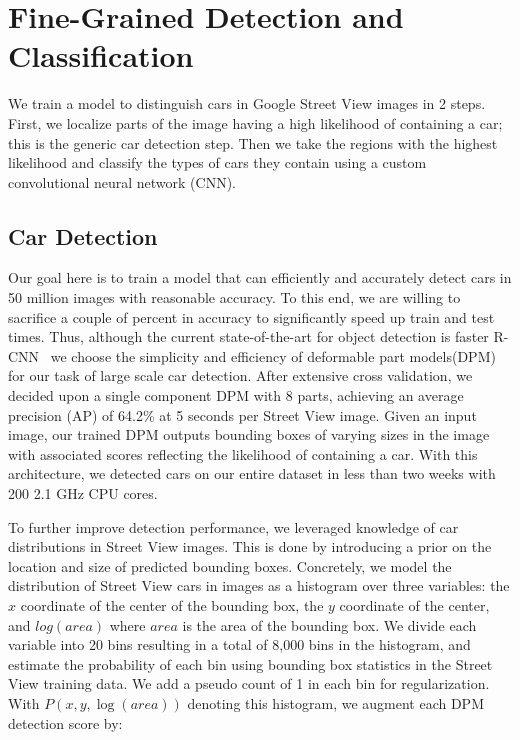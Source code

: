 \documentclass[letterpaper]{article}
\begin{document}
\section{Fine-Grained Detection and Classification}
\label{sec:detection}
We train a model to distinguish cars in Google Street View images in 2 steps. First, we localize parts of the image having a high likelihood of containing a car; this is the generic car detection step. Then we take the regions with the highest likelihood and classify the types of cars they contain using a custom convolutional neural network (CNN).

\subsection{Car Detection}
Our goal here is to train a model that can efficiently and accurately detect cars in 50 million images with reasonable accuracy. To this end, we are willing to sacrifice a couple of percent in accuracy to significantly speed up train and test times. Thus, although the current state-of-the-art for object detection is faster R-CNN~\cite{frcnn} we choose the simplicity and efficiency of deformable part models(DPM)~\cite{dpm} for our task of large scale car detection.
After extensive cross validation, we decided upon a single component DPM with 8 parts, achieving an average precision (AP) of 64.2\% at 5 seconds per Street View image. Given an input image, our trained DPM outputs bounding boxes of varying sizes in the image with associated scores reflecting the likelihood of containing a car. With this architecture, we detected cars on our entire dataset in less than two weeks with 200 2.1 GHz CPU cores.

To further improve detection performance, we leveraged knowledge of car distributions in Street View images. This is done by introducing a prior on the location and size of predicted bounding boxes. Concretely, we model the distribution of Street View cars in images as a histogram over three variables: the $x$ coordinate of the center of the bounding box, the $y$ coordinate of the center, and $log(area)$ where $area$ is the area of the bounding box. We divide each variable into 20 bins resulting in a total of 8,000 bins in the histogram, and estimate the probability of each bin using bounding box statistics in the Street View training data. We add a pseudo count of 1 in each bin for regularization. With $P(x,y,\log{(area)})$ denoting this histogram, we augment each DPM detection score by:
\end{document}
